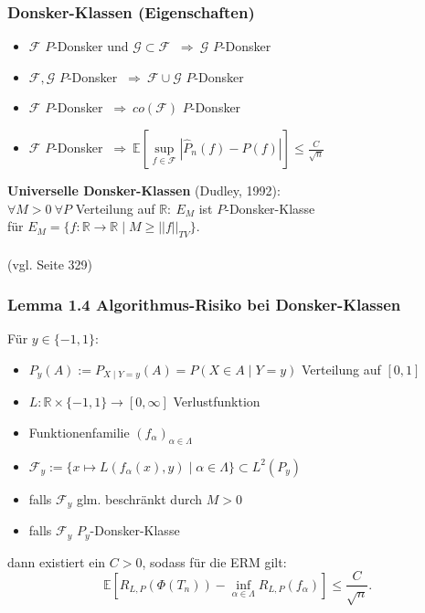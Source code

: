 \documentclass{beamer}
\newcommand{\R}{\mathbb{R}} %
\newcommand{\E}{\mathbb{E}} %
\newcommand{\F}{\mathcal{F}}
\newcommand{\G}{\mathcal{G}}
\begin{document}
	\begin{frame}
		\frametitle{Donsker-Klassen (Eigenschaften)}
		\begin{itemize}
			\item $\F$ $P$-Donsker und $\G \subset \F$ $ \ \Rightarrow \ \G$ $P$-Donsker
			\item $\F , \G$ $P$-Donsker $ \ \Rightarrow \ \F \cup \G$ $P$-Donsker
			\item $\F$ $P$-Donsker $ \ \Rightarrow \ co(\F)$ $P$-Donsker
			\item $\F$ $P$-Donsker $ \ \Rightarrow \ \E\left[ \sup\limits_{f \in \F} \left| \hat{P}_n(f) - P(f) \right| \right] \leq \frac{C}{\sqrt{n}}$
		\end{itemize}
		\pause
		\begin{mdframed}
			\textbf{Universelle Donsker-Klassen} (Dudley, 1992):\\
			$\forall M > 0 \ \forall P $ Verteilung auf $\R : \ E_M$ ist $P$-Donsker-Klasse\\
			für $E_M = \{f : \R \rightarrow \R \mid M \geq ||f||_{TV} \}$.\\
			\\
			(vgl. \cite{DudleyUCLT} Seite 329)
		\end{mdframed}
	\end{frame}
	
	\begin{frame}
		\frametitle{Lemma 1.4 Algorithmus-Risiko bei Donsker-Klassen}
		Für $y \in \{-1,1\}$:
		\begin{itemize}
			\item $P_y(A) := P_{X \mid Y=y}(A) = P(X \in A \mid Y=y)$ Verteilung auf $[0,1]$
			\item $L : \R \times \{-1,1\} \rightarrow [0,\infty]$ Verlustfunktion
			\item Funktionenfamilie $(f_\alpha)_{\alpha \in \Lambda}$
			\item $\F_y := \{ x \mapsto L(f_\alpha(x),y) \mid \alpha \in \Lambda \} \subset L^2(P_y)$
			\item falls $\F_y$ glm. beschränkt durch $M > 0$
			\item falls $\F_y$ $P_y$-Donsker-Klasse
		\end{itemize}
		dann existiert ein $C > 0$, sodass für die ERM gilt:
		$$
		\E\left[ R_{L,P}(\Phi(T_n)) - \inf_{\alpha \in \Lambda} R_{L,P}(f_\alpha) \right] \leq \frac{C}{\sqrt{n}} .
		$$
	\end{frame}
\end{document}
